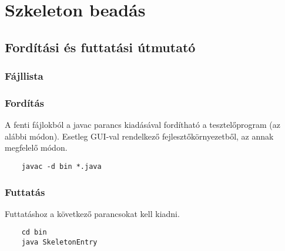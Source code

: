 \documentclass[../../projlab]{subfiles}
\begin{document}
\makeatletter


\makeatother

\chapter{Szkeleton beadás}

\section{Fordítási és futtatási útmutató}

\subsection{Fájllista}

\begin{fajllista}
	
\end{fajllista}

\subsection{Fordítás}

A fenti fájlokból a javac parancs kiadásával fordítható a tesztelőprogram (az alábbi módon).
Esetleg GUI-val rendelkező fejlesztőkörnyezetből, az annak megfelelő módon.

\begin{verbatim}
    javac -d bin *.java
\end{verbatim}

\subsection{Futtatás}

Futtatáshoz a következő parancsokat kell kiadni.
\begin{verbatim}
    cd bin
    java SkeletonEntry
\end{verbatim}
\end{document}
